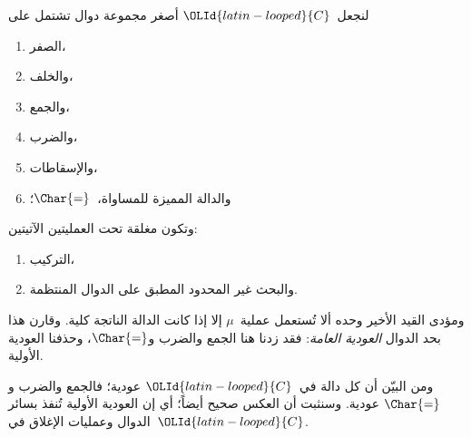 \documentclass[../../../include/open-logic-section]{subfiles}
\begin{document}

لنجعل~$\OLId{latin-looped}{C}$ أصغر مجموعة دوال تشتمل على
\begin{enumerate}
\item الصفر،
\item والخلف،
\item والجمع،
\item والضرب،
\item والإسقاطات،
\item والدالة المميزة للمساواة،~$\Char{=}$؛
\end{enumerate}
وتكون مغلقة تحت العمليتين الآتيتين:
\begin{enumerate}
\item التركيب،
\item والبحث غير المحدود المطبق على الدوال المنتظمة.
\end{enumerate}
ومؤدى القيد الأخير وحده ألا تُستعمل عملية~$\mu$ إلا إذا كانت الدالة
الناتجة كلية. وقارن هذا بحد الدوال \emph{العودية العامة}: فقد زدنا هنا
الجمع والضرب و$\Char{=}$، وحذفنا العودية الأولية.

ومن البيّن أن كل دالة في~$\OLId{latin-looped}{C}$ عودية؛ فالجمع والضرب و$\Char{=}$ عودية.
وسنثبت أن العكس صحيح أيضاً؛ أي إن العودية الأولية تُنفذ بسائر الدوال
وعمليات الإغلاق في~$\OLId{latin-looped}{C}$.
\end{document}
